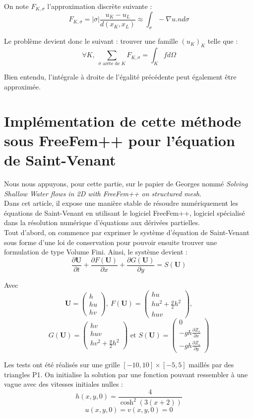On note $F_{K,\sigma}$ l'approximation discrète suivante :
\begin{equation} \label{Fksig}
	F_{K,\sigma}=|\sigma|\frac{u_K-u_L}{d(x_K,x_L)}\approx \int_{\sigma} -\nabla u.n d\sigma
\end{equation}

Le problème devient donc le suivant : trouver une famille $(u_K)_K$ telle que :
	\[\forall K,\ \sum_{\sigma \text{ arête de } K} F_{K,\sigma}=\int_K f d\Omega\]

Bien entendu, l'intégrale à droite de l'égalité précédente peut également être approximée. 

\section{Implémentation de cette méthode sous FreeFem++ pour l'équation de Saint-Venant}
Nous nous appuyons, pour cette partie, sur le papier de Georges  nommé \textit{Solving Shallow Water flows in 2D with FreeFem++ on structured mesh}.\\
Dans cet article, il expose une manière stable de résoudre numériquement les équations de Saint-Venant en utilisant le logiciel FreeFem++, logiciel spécialisé dans la résolution numérique d'équations aux dérivées partielles.\\
Tout d'abord, on commence par exprimer le système d'équation de Saint-Venant sous forme d'une loi de conservation pour pouvoir ensuite trouver une formulation de type Volume Fini. Ainsi, le système devient :
\begin{equation} \label{systSVSadaka}
	\frac{\partial \textbf{U}}{\partial t}+\frac{\partial F(\textbf{U})}{\partial x} + \frac{\partial G(\textbf{U})}{\partial y}=S(\textbf{U})
\end{equation}

Avec \[\textbf{U}=\begin{pmatrix} h\\hu\\hv\end{pmatrix},\ F(\textbf{U})=\begin{pmatrix} hu\\ hu^2+\frac{g}{2}h^2\\huv \end{pmatrix},\] \[G(\textbf{U})=\begin{pmatrix} hv\\huv\\hv^2+\frac{g}{2}h^2\end{pmatrix} \text{ et } S(\textbf{U})=\begin{pmatrix} 0\\-gh\frac{\partial Z_s}{\partial x} \\ -gh\frac{\partial Z_s}{\partial y} \end{pmatrix}\]

Les tests ont été réalisés sur une grille $[-10,10]\times[-5,5]$ maillés par des triangles P1. On initialise la solution par une fonction pouvant ressembler à une vague avec des vitesses initiales nulles :
	\[h(x,y,0)=\frac{4}{\cosh^2(3(x+2))}\]
	\[u(x,y,0)=v(x,y,0)=0\]
